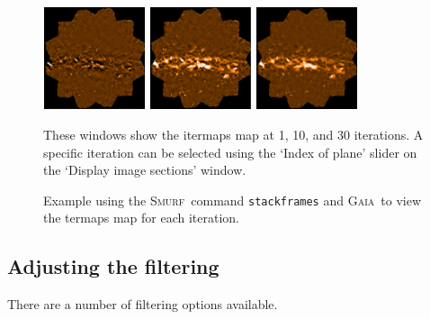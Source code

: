 \documentclass[twoside,11pt]{article}
\newenvironment{fmpage}[1]
{\begin{lrbox}{\fmbox}\begin{minipage}{#1}}
{\end{minipage}\end{lrbox}\fbox{\usebox{\fmbox}}}
\newcounter{box}
\newcommand{\xref}[3]{#1}
\newcommand{\xlabel}[1]{}
\renewcommand{\_}{\texttt{\symbol{95}}}
\newcommand{\gaia}{\xref{\textsc{Gaia}}{sun214}{}}
\newcommand{\smurf}{\xref{\textsc{Smurf}}{sun258}{}}
\begin{document}
\begin{figure}[ht!]
\begin{center}
\begin{fmpage}{0.95\linewidth}
\begin{minipage}[c]{0.65\linewidth}
\centering
\hspace{0.5mm}
\includegraphics[width=3cm, height=3cm]{iter1.eps}
\includegraphics[width=3cm, height=3cm]{iter2.eps}
\includegraphics[width=3cm, height=3cm]{iter31.eps}
\vspace{0.2cm}
\end{minipage}
\hspace{0.3cm}
\begin{minipage}[c]{0.29\linewidth}
These windows show the itermaps map at 1, 10, and 30 iterations. A specific iteration can be selected using the `Index of plane' slider on the `Display image sections' window.
\vspace{0.2cm}
\end{minipage}

\end{fmpage}
\end{center}
\caption{\small Example using the \smurf\ command \texttt{stackframes} and \gaia\ to view the termaps map for each iteration.}
\label{fig:stack} 
\end{figure}


\subsection{\xlabel{filter}Adjusting the filtering}
\label{sec:filt}
There are a number of filtering options available.
\end{document}

